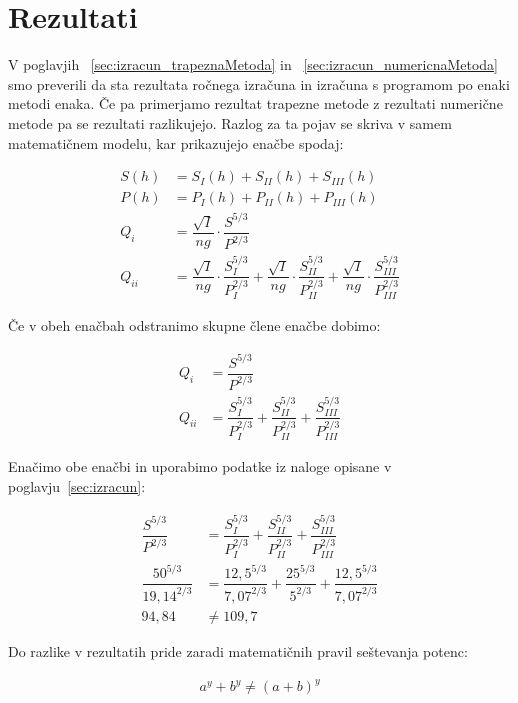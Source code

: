 \section{Rezultati}
V poglavjih ~\ref{sec:izracun_trapeznaMetoda} in ~\ref{sec:izracun_numericnaMetoda} smo preverili da sta rezultata ročnega izračuna in izračuna s programom po enaki metodi enaka. Če pa primerjamo rezultat trapezne metode z rezultati numerične metode pa se rezultati razlikujejo. Razlog za ta pojav se skriva v samem matematičnem modelu, kar prikazujejo enačbe spodaj:

\begin{ceqn}
\begin{align}
S(h)&= S_I(h) + S_{II}(h) + S_{III}(h)\\
P(h)&= P_I(h) + P_{II}(h) + P_{III}(h)\\
Q_i &= \dfrac{\sqrt{I}}{ng} \cdot \dfrac{S^{5/3}}{P^{2/3}} \\
Q_{ii} &= \dfrac{\sqrt{I}}{ng} \cdot \dfrac{S_I^{5/3}}{P_I^{2/3}} + \dfrac{\sqrt{I}}{ng} \cdot \dfrac{S_{II}^{5/3}}{P_{II}^{2/3}} + \dfrac{\sqrt{I}}{ng} \cdot \dfrac{S_{III}^{5/3}}{P_{III}^{2/3}}
\end{align}
\end{ceqn}

Če v obeh enačbah odstranimo skupne člene enačbe dobimo:

\begin{ceqn}
\begin{align}
Q_i &=\dfrac{S^{5/3}}{P^{2/3}}\\
Q_{ii} &= \dfrac{S_I^{5/3}}{P_I^{2/3}} + \dfrac{S_{II}^{5/3}}{P_{II}^{2/3}} + \dfrac{S_{III}^{5/3}}{P_{III}^{2/3}}
\end{align}
\end{ceqn}


Enačimo obe enačbi in uporabimo podatke iz naloge opisane v poglavju~\ref{sec:izracun}:
\begin{ceqn}
\begin{align}
\dfrac{S^{5/3}}{P^{2/3}} &= \dfrac{S_I^{5/3}}{P_I^{2/3}} + \dfrac{S_{II}^{5/3}}{P_{II}^{2/3}} + \dfrac{S_{III}^{5/3}}{P_{III}^{2/3}}\\
\dfrac{50^{5/3}}{19,14^{2/3}} &= \dfrac{12,5^{5/3}}{7,07^{2/3}} + \dfrac{25^{5/3}}{5^{2/3}} + \dfrac{12,5^{5/3}}{7,07^{2/3}}\\
94,84 &\neq 109,7
\end{align}
\end{ceqn}


Do razlike v rezultatih pride zaradi matematičnih pravil seštevanja potenc:
\begin{ceqn}
\begin{align}
a^y + b^y \neq (a+b)^y
\end{align}
\end{ceqn}


